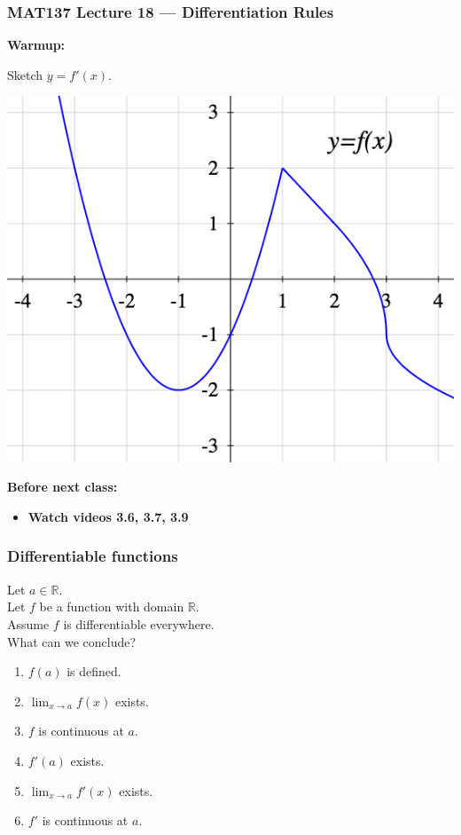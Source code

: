 \documentclass[14pt]{beamer}
\newcommand {\DS} [1] {${\displaystyle #1}$}
\newcommand {\R}{\mathbb{R}}
\begin{document}
\begin{frame}
	\frametitle{MAT137 Lecture 18 --- Differentiation Rules}

	{\bf Warmup:}

	Sketch $y=f'(x)$.

\begin{center}
\includegraphics[scale=.3]{G4}
\end{center}
	\vfill
	{\bf Before next class:}
		\begin{itemize} \normalsize
			\item {\bf Watch videos 3.6, 3.7, 3.9 }
		\end{itemize}
\end{frame}

\begin{frame}[t]
\frametitle{Differentiable functions}

Let $a \in \R$.  \\
Let $f$ be a function with domain $\R$.  \\
Assume $f$ is differentiable everywhere.  \\
What can we conclude?

\begin{multicols}{2}
\begin{enumerate}
	\item  $f(a)$ is defined.
	\item \DS{\lim_{x \to a} f(x)} exists.
	\item  $f$ is continuous at $a$.
	\item  $f'(a)$ exists.
	\item  \DS{\lim_{x \to a} f'(x)} exists.
	\item  \DS{f'} is continuous at $a$.
\end{enumerate}
\end{multicols}
 
\end{frame}
\end{document}
